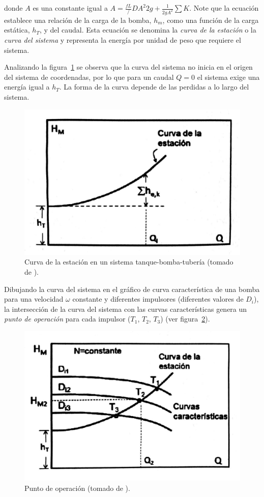 \documentclass[11pt, oneside]{article}
\begin{document}
donde $A$ es una constante igual a $A = \frac{fL}/{D A^2 2 g} + \frac{1}{2g A^2}\sum K$. Note que la ecuaci\'on establece una relaci\'on de la carga de la bomba, $h_m$, como una funci\'on de la carga est\'atica, $h_T$, y del caudal. Esta ecuaci\'on se denomina la \emph{curva de la estaci\'on} o la \emph{curva del sistema} y representa la energ\'ia por unidad de peso que requiere el sistema. 

Analizando la figura~\ref{bom13} se observa que la curva del sistema no inicia en el origen del sistema de coordenadas, por lo que para un caudal $Q=0$ el sistema exige una energ\'ia igual a $h_T$. La forma de la curva depende de las perdidas a lo largo del sistema. 

\begin{figure}[h]
\centering
\includegraphics[width=12cm]{./figs/bom13.jpeg}
\caption{Curva de la estaci\'on en un sistema tanque-bomba-tuber\'ia (tomado de \cite{agudelo2011mecanica}).} 
\label{bom13}
\end{figure}

Dibujando la curva del sistema en el gr\'afico de curva caracter\'istica de una bomba para una velocidad $\omega$ constante y diferentes impulsores (diferentes valores de $D_i$), la intersecci\'on de la curva del sistema con las curvas caracter\'isticas genera un \emph{punto de operaci\'on} para cada impulsor ($T_1$, $T_2$, $T_3$) (ver figura~\ref{bom14}).

\begin{figure}[h]
\centering
\includegraphics[width=12cm]{./figs/bom14.jpeg}
\caption{Punto de operaci\'on (tomado de \cite{agudelo2011mecanica}).} 
\label{bom14}
\end{figure}
\end{document}
